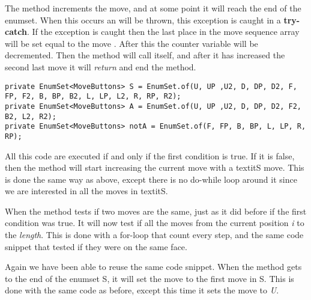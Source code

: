 The method increments the move, and at some point it will reach the end of the enumset.
When this occurs an  will be thrown, this exception is caught in a \textbf{try-catch}.
If the exception is caught then the last place in the move sequence array will be set equal to the move .
After this the counter variable  will be decremented.
Then the method will call itself, and after it has increased the second last move it will \textit{return} and end the method.

\begin{lstlisting}[style=sourceCode, caption=\myCaption{The definition of the enumsets S, A, and notA.}, label=src:enumset]
private EnumSet<MoveButtons> S = EnumSet.of(U, UP ,U2, D, DP, D2, F, FP, F2, B, BP, B2, L, LP, L2, R, RP, R2);
private EnumSet<MoveButtons> A = EnumSet.of(U, UP ,U2, D, DP, D2, F2, B2, L2, R2);
private EnumSet<MoveButtons> notA = EnumSet.of(F, FP, B, BP, L, LP, R, RP);
\end{lstlisting}

All this code are executed if and only if the first condition is true.
If it is false, then the method will start increasing the current move with a textit{S} move.
This is done the same way as above, except there is no do-while loop around it since we are interested in all the moves in textit{S}.

When the method tests if two moves are the same, just as it did before if the first condition was true.
It will now test if all the moves from the current position \textit{i} to the \textit{length}.
This is done with a for-loop that count every step, and the same code snippet that tested if they were on the same face.

Again we have been able to reuse the same code snippet.
When the method gets to the end of the enumset S, it will set the move to the first move in S.
This is done with the same code as before, except this time it sets the move to \textit{U}.